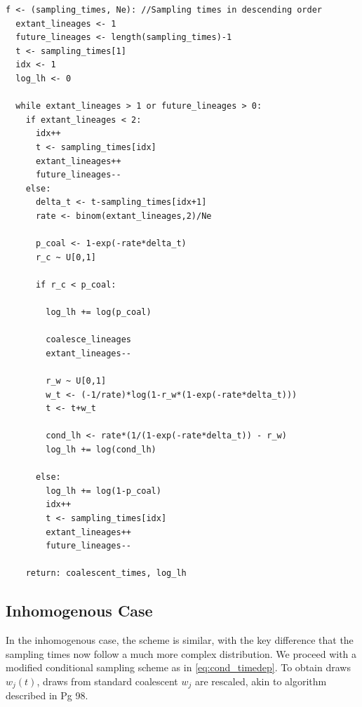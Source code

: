 \documentclass{article}
\theoremstyle{definition}
\begin{document}
\begin{lstlisting}
f <- (sampling_times, Ne): //Sampling times in descending order
  extant_lineages <- 1
  future_lineages <- length(sampling_times)-1
  t <- sampling_times[1]
  idx <- 1
  log_lh <- 0

  while extant_lineages > 1 or future_lineages > 0:
    if extant_lineages < 2:
      idx++
      t <- sampling_times[idx]
      extant_lineages++
      future_lineages--
    else:
      delta_t <- t-sampling_times[idx+1]
      rate <- binom(extant_lineages,2)/Ne

      p_coal <- 1-exp(-rate*delta_t)
      r_c ~ U[0,1] 

      if r_c < p_coal:

        log_lh += log(p_coal)

        coalesce_lineages
        extant_lineages--

        r_w ~ U[0,1]
        w_t <- (-1/rate)*log(1-r_w*(1-exp(-rate*delta_t)))
        t <- t+w_t

        cond_lh <- rate*(1/(1-exp(-rate*delta_t)) - r_w)
        log_lh += log(cond_lh)

      else:
        log_lh += log(1-p_coal)
        idx++
        t <- sampling_times[idx]
        extant_lineages++
        future_lineages--

    return: coalescent_times, log_lh
\end{lstlisting}

\subsection{Inhomogenous Case}
In the inhomogenous case, the scheme is similar, with the key difference that the sampling times now follow a much more complex distribution. We proceed with a modified conditional sampling scheme as in \ref{eq:cond_timedep}. To obtain draws $w_j(t)$, draws from standard coalescent $w_j$ are rescaled, akin to algorithm described in \cite{hein_gene_2004} Pg 98.
\end{document}
